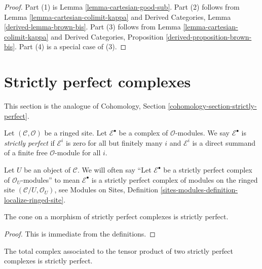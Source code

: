 \begin{proof}
Part (1) is Lemma \ref{lemma-cartesian-good-sub}.
Part (2) follows from Lemma \ref{lemma-cartesian-colimit-kappa} and
Derived Categories, Lemma \ref{derived-lemma-brown-bis}.
Part (3) follows from
Lemma \ref{lemma-cartesian-colimit-kappa} and
Derived Categories, Proposition \ref{derived-proposition-brown-bis}.
Part (4) is a special case of (3).
\end{proof}





\section{Strictly perfect complexes}
\label{section-strictly-perfect}

\noindent
This section is the analogue of
Cohomology, Section \ref{cohomology-section-strictly-perfect}.

\begin{definition}
\label{definition-strictly-perfect}
Let $(\mathcal{C}, \mathcal{O})$ be a ringed site.
Let $\mathcal{E}^\bullet$ be a complex of $\mathcal{O}$-modules.
We say $\mathcal{E}^\bullet$ is {\it strictly perfect}
if $\mathcal{E}^i$ is zero for all but finitely many $i$ and
$\mathcal{E}^i$ is a direct summand of a finite free
$\mathcal{O}$-module for all $i$.
\end{definition}

\noindent
Let $U$ be an object of $\mathcal{C}$. We will often say
``Let $\mathcal{E}^\bullet$ be a strictly perfect complex of
$\mathcal{O}_U$-modules'' to mean $\mathcal{E}^\bullet$ is a strictly perfect
complex of modules on the ringed site $(\mathcal{C}/U, \mathcal{O}_U)$, see
Modules on Sites, Definition
\ref{sites-modules-definition-localize-ringed-site}.

\begin{lemma}
\label{lemma-cone}
The cone on a morphism of strictly perfect complexes is
strictly perfect.
\end{lemma}

\begin{proof}
This is immediate from the definitions.
\end{proof}

\begin{lemma}
\label{lemma-tensor}
The total complex associated to the tensor product of two
strictly perfect complexes is strictly perfect.
\end{lemma}

